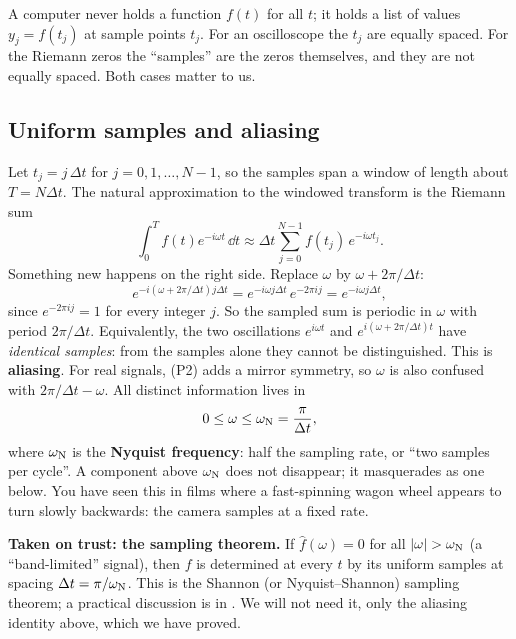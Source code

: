 A computer never holds a function $f(t)$ for all $t$; it holds a list of values $y_j=f(t_j)$ at sample points $t_j$. For an oscilloscope the $t_j$ are equally spaced. For the Riemann zeros the ``samples'' are the zeros themselves, and they are not equally spaced. Both cases matter to us.

\subsection{Uniform samples and aliasing}

Let $t_j=j\,\Delta t$ for $j=0,1,\dots,N-1$, so the samples span a window of length about $T=N\Delta t$. The natural approximation to the windowed transform is the Riemann sum
\begin{equation}
\int_0^Tf(t)e^{-i\omega t}\,\dd t\approx\Delta t\sum_{j=0}^{N-1}f(t_j)\,e^{-i\omega t_j}.
\label{eq:fourier-transform-riemannsum}
\end{equation}
Something new happens on the right side. Replace $\omega$ by $\omega+2\pi/\Delta t$:
\[e^{-i(\omega+2\pi/\Delta t)j\Delta t}=e^{-i\omega j\Delta t}\,e^{-2\pi ij}=e^{-i\omega j\Delta t},\]
since $e^{-2\pi ij}=1$ for every integer $j$. So the sampled sum is periodic in $\omega$ with period $2\pi/\Delta t$. Equivalently, the two oscillations $e^{i\omega t}$ and $e^{i(\omega+2\pi/\Delta t)t}$ have \emph{identical samples}: from the samples alone they cannot be distinguished. This is \textbf{aliasing}. For real signals, (P2) adds a mirror symmetry, so $\omega$ is also confused with $2\pi/\Delta t-\omega$. All distinct information lives in
\begin{equation}
0\le\omega\le\omega_{\rm N}=\frac{\pi}{\Delta t},
\label{eq:fourier-transform-nyquist}
\end{equation}
where $\omega_{\rm N}$ is the \textbf{Nyquist frequency}: half the sampling rate, or ``two samples per cycle''. A component above $\omega_{\rm N}$ does not disappear; it masquerades as one below. You have seen this in films where a fast-spinning wagon wheel appears to turn slowly backwards: the camera samples at a fixed rate.

\begin{beyond}
\textbf{Taken on trust: the sampling theorem.} If $\hat f(\omega)=0$ for all $\left\lvert \omega\right\rvert>\omega_{\rm N}$ (a ``band-limited'' signal), then $f$ is determined at every $t$ by its uniform samples at spacing $\Delta t=\pi/\omega_{\rm N}$. This is the Shannon (or Nyquist--Shannon) sampling theorem; a practical discussion is in \cite{nr}. We will not need it, only the aliasing identity above, which we have proved.
\end{beyond}

